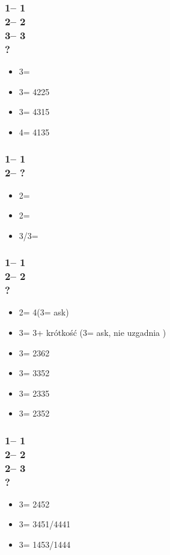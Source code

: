 \documentclass[12pt, a4paper]{report}
\begin{document}
{    \subsubsection*{1\clubs -- 1\spades\\
                    2\spades -- 2\nt\\
                    3\clubs -- 3\diams\\
                    ?}
    \begin{itemize}
        \item 3\hearts = \bal
        \item 3\spades = 4225
        \item 3\nt = 4315
        \item 4\clubs = 4135
    \end{itemize}

    \subsubsection*{1\diams -- 1\hearts\\
                    2\hearts -- ?}
    \begin{itemize}
        \item 2\spades = \gf
        \item 2\nt = \inv\ \spades
        \item 3\minor/3\hearts = \inv
    \end{itemize}

    \subsubsection*{1\diams -- 1\hearts\\
                    2\hearts -- 2\spades\\
                    ?}
    \begin{itemize}
        \item 2\nt = 4\hearts (3\clubs = ask)
        \item 3\clubs = 3\hearts + krótkość (3\diams = ask, nie uzgadnia \hearts)
        \item 3\diams = 2362
        \item 3\hearts = 3352
        \item 3\spades = 2335
        \item 3\nt = 2352
    \end{itemize}

    \subsubsection*{1\diams -- 1\hearts\\
                    2\hearts -- 2\spades\\
                    2\nt -- 3\clubs\\
                    ?}
    \begin{itemize}
        \item 3\diams = 2452
        \item 3\hearts = 3451/4441
        \item 3\spades = 1453/1444
    \end{itemize}

}
\end{document}
